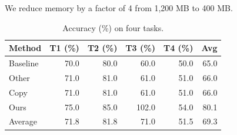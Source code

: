 \documentclass{article}
\begin{document}
We reduce memory by a factor of 4 from 1,200 MB to 400 MB.
\begin{table}[h]\centering\caption{Accuracy (\%) on four tasks.}
\begin{tabular}{lrrrrr}
\toprule
Method & T1 (\%) & T2 (\%) & T3 (\%) & T4 (\%) & Avg \\
\midrule
Baseline & 70.0 & 80.0 & 60.0 & 50.0 & 65.0 \\
Other & 71.0 & 81.0 & 61.0 & 51.0 & 66.0 \\
Copy & 71.0 & 81.0 & 61.0 & 51.0 & 66.0 \\
Ours & 75.0 & 85.0 & 102.0 & 54.0 & 80.1 \\
\midrule
Average & 71.8 & 81.8 & 71.0 & 51.5 & 69.3 \\
\bottomrule
\end{tabular}\end{table}
\end{document}
